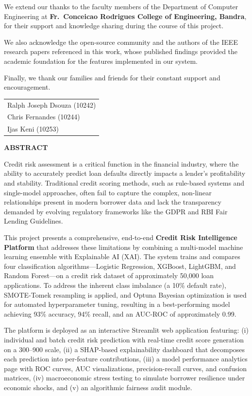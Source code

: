 \documentclass[12pt,a4paper]{report}
\begin{document}
We extend our thanks to the faculty members of the Department of Computer Engineering at \textbf{Fr.\ Conceicao Rodrigues College of Engineering, Bandra}, for their support and knowledge sharing during the course of this project.

We also acknowledge the open-source community and the authors of the IEEE research papers referenced in this work, whose published findings provided the academic foundation for the features implemented in our system.

Finally, we thank our families and friends for their constant support and encouragement.
\vspace{1.5cm}
\noindent
\begin{tabular}{l}
Ralph Joseph Dsouza (10242)\\
Chris Fernandes (10244)\\
Ijas Keni (10253)\\
\end{tabular}

\newpage\thispagestyle{empty}
\begin{center}{\Large\bfseries ABSTRACT}\\[1cm]\end{center}
Credit risk assessment is a critical function in the financial industry, where the ability to accurately predict loan defaults directly impacts a lender's profitability and stability. Traditional credit scoring methods, such as rule-based systems and single-model approaches, often fail to capture the complex, non-linear relationships present in modern borrower data and lack the transparency demanded by evolving regulatory frameworks like the GDPR and RBI Fair Lending Guidelines.

This project presents a comprehensive, end-to-end \textbf{Credit Risk Intelligence Platform} that addresses these limitations by combining a multi-model machine learning ensemble with Explainable AI (XAI). The system trains and compares four classification algorithms---Logistic Regression, XGBoost, LightGBM, and Random Forest---on a credit risk dataset of approximately 50,000 loan applications. To address the inherent class imbalance (a 10\% default rate), SMOTE-Tomek resampling is applied, and Optuna Bayesian optimization is used for automated hyperparameter tuning, resulting in a best-performing model achieving 93\% accuracy, 94\% recall, and an AUC-ROC of approximately 0.99.

The platform is deployed as an interactive Streamlit web application featuring: (i) individual and batch credit risk prediction with real-time credit score generation on a 300--900 scale, (ii) a SHAP-based explainability dashboard that decomposes each prediction into per-feature contributions, (iii) a model performance analytics page with ROC curves, AUC visualizations, precision-recall curves, and confusion matrices, (iv) macroeconomic stress testing to simulate borrower resilience under economic shocks, and (v) an algorithmic fairness audit module.
\end{document}
